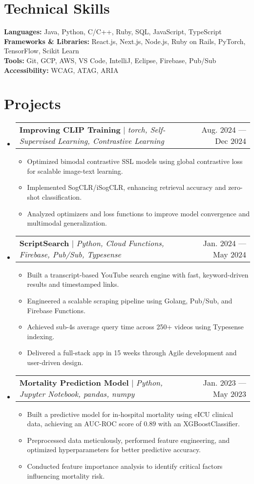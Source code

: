 \documentclass[letterpaper,12pt]{article}
\makeatletter
\newcommand{\resumeItem}[1]{
  \item\small{
    {#1 \vspace{-2pt}}
  }
}
\newcommand{\resumeProjectHeading}[2]{
    \item
    \begin{tabular*}{0.97\textwidth}{l@{\extracolsep{\fill}}r}
      \small#1 & #2 \\
    \end{tabular*}\vspace{-7pt}
}
\newcommand{\resumeSubHeadingListStart}{\begin{itemize}[leftmargin=0pt, label={}]}
\newcommand{\resumeSubHeadingListEnd}{\end{itemize}}
\newcommand{\resumeItemListStart}{\begin{itemize}[leftmargin=10pt]}
\newcommand{\resumeItemListEnd}{\end{itemize}\vspace{-10pt}}
\makeatother
\begin{document}
%
\section{Technical Skills}
\textbf{Languages:} Java, Python, C/C++, Ruby, SQL, JavaScript, TypeScript \\
\textbf{Frameworks \& Libraries:} React.js, Next.js, Node.js, Ruby on Rails, PyTorch, TensorFlow, Scikit Learn \\
\textbf{Tools:} Git, GCP, AWS, VS Code, IntelliJ, Eclipse, Firebase, Pub/Sub \\
\textbf{Accessibility:} WCAG, ATAG, ARIA \\


\vspace{-5pt}
\section{Projects}
    \resumeSubHeadingListStart
        \resumeProjectHeading
        {\textbf{Improving CLIP Training} $|$ \emph{torch, Self-Supervised Learning, Contrastive Learning}}{Aug. 2024 --- Dec 2024}
        \resumeItemListStart
            \resumeItem{Optimized bimodal contrastive SSL models using global contrastive loss for scalable image-text learning.}
            \resumeItem{Implemented SogCLR/iSogCLR, enhancing retrieval accuracy and zero-shot classification.}
            \resumeItem{Analyzed optimizers and loss functions to improve model convergence and multimodal generalization.}
        \resumeItemListEnd
        
        \resumeProjectHeading
        {\textbf{ScriptSearch} $|$ \emph{Python, Cloud Functions, Firebase, Pub/Sub, Typesense}}{Jan. 2024 --- May 2024}
        \resumeItemListStart
            \resumeItem{Built a transcript-based YouTube search engine with fast, keyword-driven results and timestamped links.}
            \resumeItem{Engineered a scalable scraping pipeline using Golang, Pub/Sub, and Firebase Functions.}
            \resumeItem{Achieved sub-4s average query time across 250+ videos using Typesense indexing.}
            \resumeItem{Delivered a full-stack app in 15 weeks through Agile development and user-driven design.}
        \resumeItemListEnd

        \resumeProjectHeading
        {\textbf{Mortality Prediction Model} $|$ \emph{Python, Jupyter Notebook, pandas, numpy}}{Jan. 2023 --- May 2023}
        \resumeItemListStart
            \resumeItem{Built a predictive model for in-hospital mortality using eICU clinical data, achieving an AUC-ROC score of $0.89$ with an XGBoostClassifier.}
            \resumeItem{Preprocessed data meticulously, performed feature engineering, and optimized hyperparameters for better predictive accuracy.}
            \resumeItem{Conducted feature importance analysis to identify critical factors influencing mortality risk.}
        \resumeItemListEnd
    \resumeSubHeadingListEnd

\end{document}
